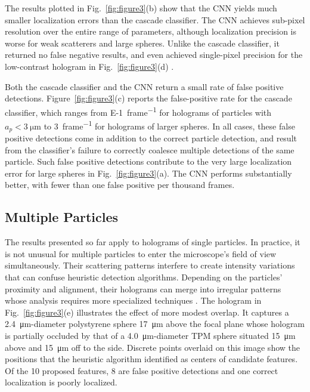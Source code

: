 The results plotted in Fig.~\ref{fig:figure3}(b) show that
the CNN yields much smaller
localization errors than the cascade classifier.
The CNN achieves sub-pixel
resolution over the entire range of parameters,
although localization precision is worse for
weak scatterers and large spheres.
Unlike the cascade classifier, it returned no
false negative results, and even achieved single-pixel
precision for the low-contrast hologram in
Fig.~\ref{fig:figure3}(d) \cite{hannel18}.

Both the cascade classifier and the CNN
return a small rate of false positive detections.
Figure~\ref{fig:figure3}(c) reports the false-positive
rate for the cascade classifier, which ranges from
\SI{E-1}{frame^{-1}} for holograms of particles with
$a_p < \SI{3}{\um}$
to \SI{3}{frame^{-1}} for holograms of larger spheres.
In all cases, these false positive detections come in addition
to the correct particle detection, and result from
the classifier's failure to correctly coalesce multiple detections
of the same particle.
Such false positive detections contribute to the very large
localization error for large spheres in Fig.~\ref{fig:figure3}(a).
The CNN performs substantially
better, with fewer than one false positive per thousand
frames.

\subsection{Multiple Particles}

The results presented so far apply to holograms of single
particles.
In practice, it is not unusual for multiple particles to enter 
the microscope's field of view simultaneously.
Their scattering patterns interfere to create
intensity variations that can confuse heuristic detection algorithms.
Depending on the particles' proximity and alignment, their
holograms can merge into irregular patterns whose analysis
requires more specialized techniques \cite{perry12,fung13}.
The hologram in Fig.~\ref{fig:figure3}(e)
illustrates the effect of more modest overlap.
It captures a \SI{2.4}{\um}-diameter
polystyrene sphere \SI{17}{\um} above the focal plane
whose hologram is partially occluded by that 
of a \SI{4.0}{\um}-diameter TPM sphere situated \SI{15}{\um}
above and \SI{15}{\um} off to the side.
Discrete points overlaid on this image show the
positions that the heuristic algorithm
identified as centers of candidate features.
Of the 10 proposed features, 8 are false positive detections
and one correct localization is poorly localized.

